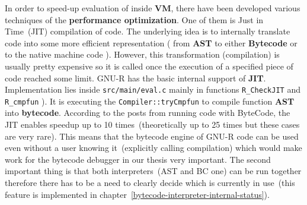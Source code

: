 \documentclass[thesis=M,english]{FITthesis}[2018/10/20]
\newcommand{\code}[1]{\texttt{#1}}
\begin{document}
In order to speed-up evaluation of inside \textbf{VM}, there have been developed various techniques of the \textbf{performance optimization}. One of them is Just in Time~(JIT) compilation of code. The underlying idea is to internally translate code into some more efficient representation ( from \textbf{AST} to either \textbf{Bytecode} or to the native machine code ). However, this transformation (compilation) is usually pretty expensive so it is called once the execution of a specified piece of code reached some limit.
GNU-R has the basic internal support of \textbf{JIT}. Implementation lies inside \code{src/main/eval.c} mainly in functions \code{R{\_}CheckJIT} and \code{R{\_}cmpfun} ). It is executing the \code{Compiler::tryCmpfun} to compile function \textbf{AST} into \textbf{bytecode}. According to the posts from running code with ByteCode, the JIT enables speedup up to 10 times~(theoretically up to 25 times but these cases are very rare).
This means that the bytecode engine of GNU-R code can be used even without a user knowing it~(explicitly calling compilation) which would make work for the bytecode debugger in our thesis very important. The second important thing is that both interpreters~(AST and BC one) can be run together therefore there has to be a need to clearly decide which is currently in use~(this feature is implemented in chapter~\ref{bytecode-interpreter-internal-status}).



%
%
%
%
%
%
%
%
%
%
%
%
%
%
%
\end{document}
